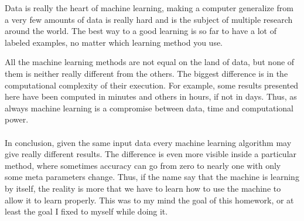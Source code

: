 \documentclass[twocolumn,a4paper,10pt]{article}
\begin{document}
Data is really the heart of machine learning, making a computer generalize
from a very few amounts of data is really hard and is the subject
of multiple research around the world. The best way to a good learning
is so far to have a lot of labeled examples, no matter which learning
method you use.

All the machine learning methods are not equal on the land of data,
but none of them is neither really different from the others. The
biggest difference is in the computational complexity of their execution.
For example, some results presented here have been computed in minutes
and others in hours, if not in days. Thus, as always machine learning
is a compromise between data, time and computational power.

\paragraph{}

In conclusion, given the same input data every machine learning algorithm
may give really different results. The difference is even more visible
inside a particular method, where sometimes accuracy can go from zero
to nearly one with only some meta parameters change. Thus, if the
name say that the machine is learning by itself, the reality is more
that we have to learn how to use the machine to allow it to learn
properly. This was to my mind the goal of this homework, or at least
the goal I fixed to myself while doing it. 
\end{document}
